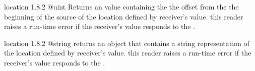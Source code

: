 {location}
{1.8.2}
{@uint}
{Returns an  value containing the the offset from the the beginning of the source of the location defined by receiver's value.}
{this reader raises a run-time error if the receiver's value responds  to the .}


{location}
{1.8.2}
{@string}
{returns an  object that contains a string representation of the location defined by receiver's value.}
{this reader raises a run-time error if the receiver's value responds  to the .}
